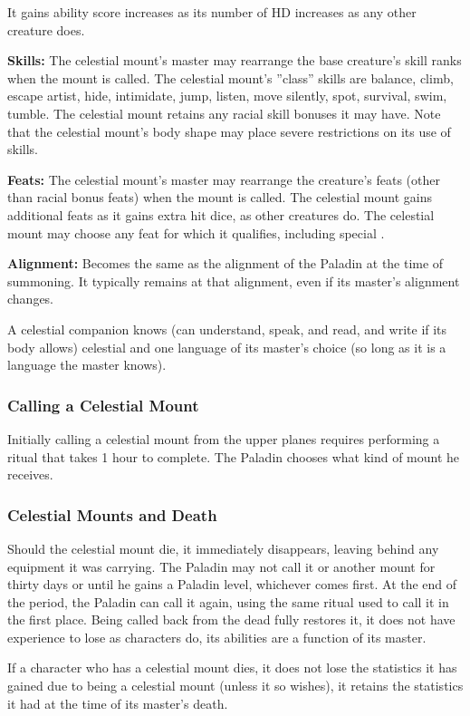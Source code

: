 \begin{list}{}{\leftmargin=1em}
 It gains ability score increases as its number of HD increases as any other creature does.
 \item \textbf{Skills:} The celestial mount's master may rearrange the base creature's skill ranks when the mount is called. 
 The celestial mount's ''class'' skills are balance, climb, escape artist, hide, intimidate, jump, listen, move silently, spot, survival, swim, tumble. 
 The celestial mount retains any racial skill bonuses it may have.
 Note that the celestial mount's body shape may place severe restrictions on its use of skills.
 \item \textbf{Feats:} The celestial mount's master may rearrange the creature's feats (other than racial bonus feats) when the mount is called.
 The celestial mount gains additional feats as it gains extra hit dice, as other creatures do. 
 The celestial mount may choose any feat for which it qualifies, including special .
 \item \textbf{Alignment:} Becomes the same as the alignment of the Paladin at the time of summoning. 
 It typically remains at that alignment, even if its master's alignment changes.
\end{list}
A celestial companion knows (can understand, speak, and read, and write if its body allows) 
celestial and one language of its master's choice (so long as it is a language the master knows). 
\subsubsection{Calling a Celestial Mount}
Initially calling a celestial mount from the upper planes requires performing a ritual that takes 1 hour to complete.
The Paladin chooses what kind of mount he receives.
\subsubsection{Celestial Mounts and Death}
Should the celestial mount die, it immediately disappears, leaving behind any equipment it was carrying. 
The Paladin may not call it or another mount for thirty days or until he gains a Paladin level, whichever comes first.
At the end of the period, the Paladin can call it again, using the same ritual used to call it in the first place.
Being called back from the dead fully restores it, it does not have experience to lose as characters do, its abilities are a function of its master.

If a character who has a celestial mount dies, 
it does not lose the statistics it has gained due to being a celestial mount (unless it so wishes), 
it retains the statistics it had at the time of its master's death.

